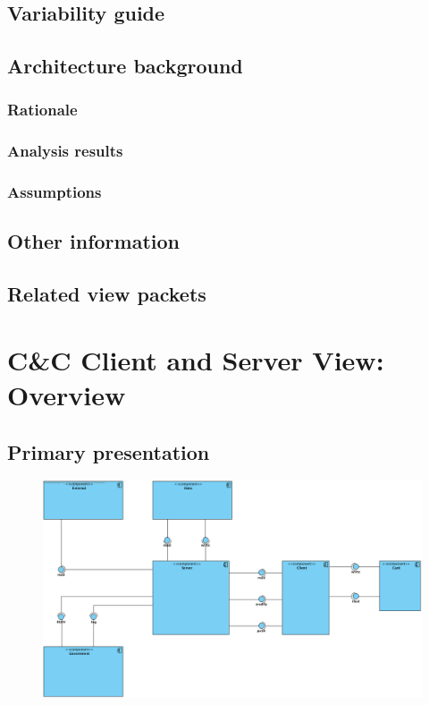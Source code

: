 \documentclass[a4paper,10pt]{book}
\begin{document}
\subsection{Variability guide}

\subsection{Architecture background}

\subsubsection{Rationale}

\subsubsection{Analysis results}

\subsubsection{Assumptions}

\subsection{Other information}

\subsection{Related view packets}




\section{C\&C Client and Server View: Overview}
\label{Client and Server View: Overview}

\subsection{Primary presentation}

\begin{center}
    \begin{figure}
      \includegraphics[width=\textwidth]{../images/ClientServer_Overview.png}
    \end{figure}
  \end{center}
\end{document}
